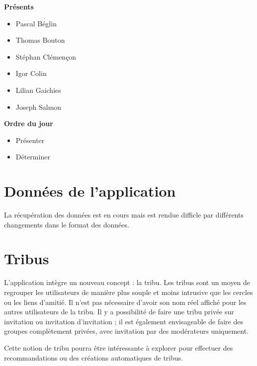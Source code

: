 \documentclass[a4paper]{article}
\begin{document}
\begin{description}
    \item \textbf{Présents}
        \begin{itemize}
            \item Pascal Béglin
            \item Thomas Bouton
            \item Stéphan Clémençon
            \item Igor Colin
            \item Lilian Gaichies
            \item Joseph Salmon
        \end{itemize}
    \item \textbf{Ordre du jour}
        \begin{itemize}
            \item Présenter
            \item Déterminer
        \end{itemize}
\end{description}

\section*{Données de l'application}

La récupération des données est en cours mais est rendue difficle par
différents changements dans le format des données.

\section*{Tribus}
\label{sec:tribus}
L'application intègre un nouveau concept : la tribu. Les tribus sont un moyen
de regrouper les utilisateurs de manière plus souple et moins intrusive que les
cercles ou les liens d'amitié. Il n'est pas nécessaire d'avoir son nom réel
affiché pour les autres utilisateurs de la tribu. Il y a possibilité de faire
une tribu privée sur invitation ou invitation d'invitation ; il est également
envisageable de faire des groupes complètement privées, avec invitation par des
modérateurs uniquement.

Cette notion de tribu pourra être intéressante à explorer pour effectuer des
recommandations ou des créations automatiques de tribus.
\end{document}
